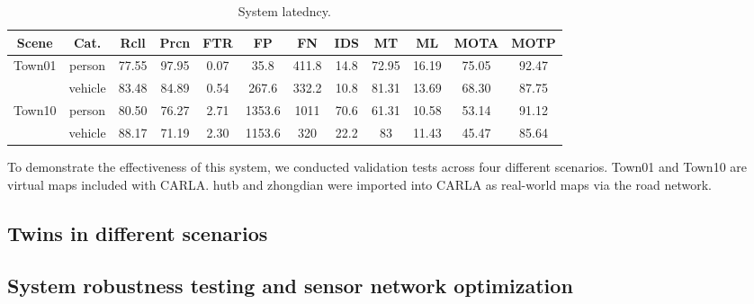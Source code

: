 \documentclass[lineno,pdflatex,sn-basic]{sn-jnl}%
\theoremstyle{thmstyleone}%
\theoremstyle{thmstyletwo}%
\theoremstyle{thmstylethree}%
\begin{document}
\begin{table}[htbp]
  \centering
  \footnotesize
  \setlength{\tabcolsep}{3pt}
  \caption{System latedncy.}
  \label{tab:algorithmsd}

  \begin{tabular*}{\textwidth}{@{\extracolsep{\fill}}cccccccccccc}
    \toprule
    \textbf{Scene} & \textbf{Cat.} & \textbf{Rcll} & \textbf{Prcn} & \textbf{FTR} & \textbf{FP} & \textbf{FN} & \textbf{IDS} & \textbf{MT} & \textbf{ML} & \textbf{MOTA} & \textbf{MOTP} \\
    \midrule
    \multirow{2}{*}{Town01} & person & 77.55 & 97.95 & 0.07 & 35.8 & 411.8 & 14.8 & 72.95 & 16.19 & 75.05 & 92.47 \\
                            & vehicle & 83.48 & 84.89 & 0.54 & 267.6 & 332.2 & 10.8 & 81.31 & 13.69 & 68.30 & 87.75 \\
    \midrule
    \multirow{2}{*}{Town10} & person & 80.50 & 76.27 & 2.71 & 1353.6 & 1011 & 70.6 & 61.31 & 10.58 & 53.14 & 91.12 \\
                            & vehicle & 88.17 & 71.19 & 2.30 & 1153.6 & 320 & 22.2 & 83 & 11.43 & 45.47 & 85.64 \\
    \bottomrule
  \end{tabular*}
\end{table}

To demonstrate the effectiveness of this system, we conducted validation tests across four different scenarios.
Town01 and Town10 are virtual maps included with CARLA.
hutb and zhongdian were imported into CARLA as real-world maps via the road network.



\subsection{Twins in different scenarios}


\subsection{System robustness testing and sensor network optimization}
\end{document}
